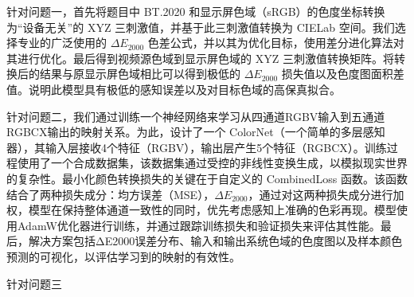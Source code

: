 %
%
\begin{cabstract}	%
针对问题一，首先将题目中 BT.2020 和显示屏色域（sRGB）的色度坐标转换为“设备无关”的 XYZ 三刺激值，并基于此三刺激值转换为 CIELab 空间。我们选择专业的广泛使用的 $\Delta E_{2000}$ 色差公式，并以其为优化目标，使用差分进化算法对其进行优化。最后得到视频源色域到显示屏色域的 XYZ 三刺激值转换矩阵。将转换后的结果与原显示屏色域相比可以得到极低的 $\Delta E_{2000}$ 损失值以及色度图面积差值。说明此模型具有极低的感知误差以及对目标色域的高保真拟合。

针对问题二，我们通过训练一个神经网络来学习从四通道RGBV输入到五通道RGBCX输出的映射关系。为此，设计了一个 ColorNet（一个简单的多层感知器），其输入层接收4个特征（RGBV），输出层产生5个特征（RGBCX）。训练过程使用了一个合成数据集，该数据集通过受控的非线性变换生成，以模拟现实世界的复杂性。最小化颜色转换损失的关键在于自定义的 CombinedLoss 函数。该函数结合了两种损失成分：均方误差（MSE），$\Delta E_{2000}$，通过对这两种损失成分进行加权，模型在保持整体通道一致性的同时，优先考虑感知上准确的色彩再现。模型使用AdamW优化器进行训练，并通过跟踪训练损失和验证损失来评估其性能。最后，解决方案包括ΔE2000误差分布、输入和输出系统色域的色度图以及样本颜色预测的可视化，以评估学习到的映射的有效性。

针对问题三
\end{cabstract}


